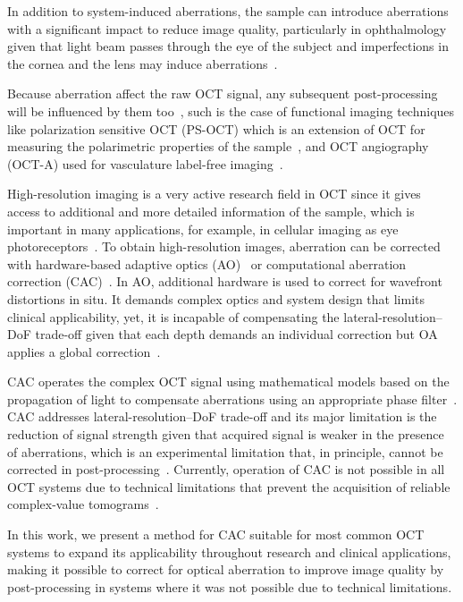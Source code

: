 In addition to system-induced aberrations, the sample can introduce aberrations with a significant impact to reduce image quality, particularly in ophthalmology given that light beam passes through the eye of the subject and imperfections in the cornea and the lens may induce aberrations~\cite{Walsh1984_Objective, Liang1997_Aberrations}.

Because aberration affect the raw OCT signal, any subsequent post-processing will be influenced by them too~\cite{Cense2009_Retinal, Park2020_Angiographic}, such is the case of functional imaging techniques like polarization sensitive OCT (PS-OCT) which is an extension of OCT for measuring the polarimetric properties of the sample~\cite{deBoer1997_Twodimensional}, and OCT angiography (OCT-A) used for vasculature label-free imaging~\cite{Wang2007_Three}.

High-resolution imaging is a very active research field in OCT since it gives access to additional and more detailed information of the sample, which is important in many applications, for example, in cellular imaging as eye photoreceptors~\cite{Zhang2006_Highspeed}. To obtain high-resolution images, aberration can be corrected with hardware-based adaptive optics (AO)~\cite{Zawadzki2005_Adaptiveoptics} or computational aberration correction (CAC)~\cite{Adie2012_Computational}. In AO, additional hardware is used to correct for wavefront distortions in situ. It demands complex optics and system design that limits clinical applicability, yet, it is incapable of compensating the lateral-resolution--DoF trade-off given that each depth demands an individual correction but OA applies a global correction~\cite{Pircher2017_Review}.

CAC operates the complex OCT signal using mathematical models based on the propagation of light to compensate aberrations using an appropriate phase filter~\cite{Ralston2006_Interferometric, Yasuno2006_Noniterative, Adie2012_Computational}. CAC addresses lateral-resolution--DoF trade-off and its major limitation is the reduction of signal strength given that acquired signal is weaker in the presence of aberrations, which is an experimental limitation that, in principle, cannot be corrected in post-processing~\cite{Wu2019_Computed}. Currently, operation of CAC is not possible in all OCT systems due to technical limitations that prevent the acquisition of reliable complex-value tomograms~\cite{Shemonski2014_Stability}.

In this work, we present a method for CAC suitable for most common OCT systems to expand its applicability throughout research and clinical applications, making it possible to correct for optical aberration to improve image quality by post-processing in systems where it was not possible due to technical limitations.

